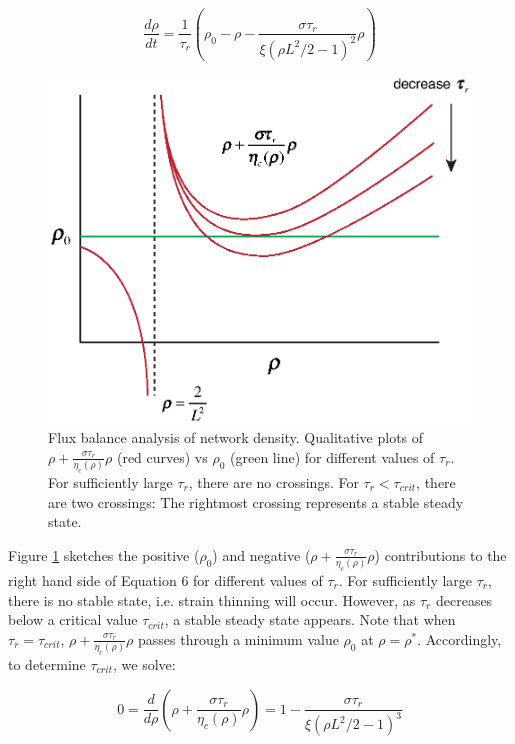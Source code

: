\begin{equation}
	\label{drho_2}
	\frac{d\rho}{dt}=\frac{1}{\tau_r}\left ( \rho_0 - \rho - \frac{\sigma \tau_r}{\xi(\rho L^2/2 -1)^2}\rho\right )
\end{equation}

\begin{figure}[h!]
	\centering
	\includegraphics[width=\hsize]{active/figures/FigS0}
	\caption{\label{fig:flux_balance}  Flux balance analysis of network density. Qualitative plots of $\rho+\frac{\sigma \tau_r}{\eta_c(\rho)}\rho$ (red curves) vs $\rho_0$ (green line) for different values of $\tau_r$.  For sufficiently large $\tau_r$, there are no crossings.  For $\tau_r < \tau_{crit}$, there are two crossings:  The rightmost crossing represents a stable steady state.  }
\end{figure}


Figure \ref{fig:flux_balance} sketches the positive ($\rho_0$) and negative ($\rho+\frac{\sigma \tau_r}{\eta_c(\rho)}\rho$) contributions to the right hand side of Equation 6 for different values of $\tau_r$. For sufficiently large $\tau_r$, there is no stable state, i.e. strain thinning will occur.  However, as $\tau_r$ decreases below a critical value $\tau_{crit}$, a stable steady state appears.  Note that when $\tau_r = \tau_{crit}$, $\rho+\frac{\sigma\tau_r}{\eta_c(\rho)}\rho$ passes through a minimum value $\rho_0$ at $\rho=\rho^*$.  Accordingly, to determine $\tau_{crit}$, we solve:

\begin{equation}
	\label{drho_3}
	0 = \frac{d}{d\rho}\left( \rho + \frac{\sigma\tau_r}{\eta_c(\rho)} \rho\right ) = 1 - \frac{\sigma\tau_r}{\xi (\rho L^2/2-1)^3}
\end{equation}


